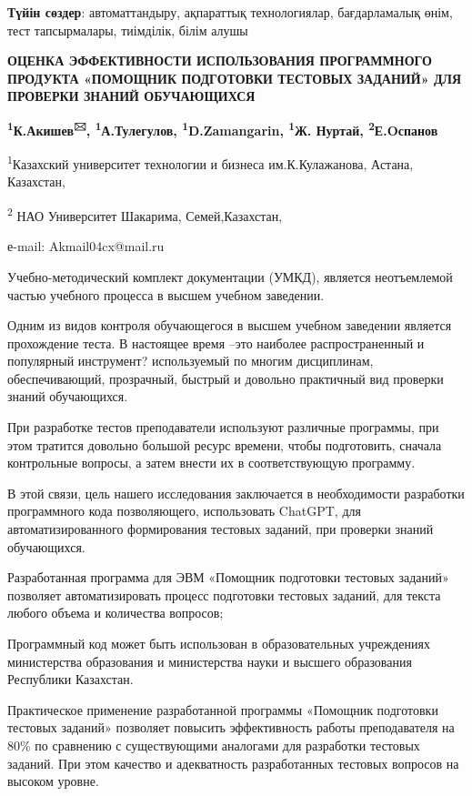 {\bfseries Түйін сөздер}: автоматтандыру, ақпараттық технологиялар,
бағдарламалық өнім, тест тапсырмалары, тиімділік, білім алушы

{\bfseries ОЦЕНКА ЭФФЕКТИВНОСТИ ИСПОЛЬЗОВАНИЯ ПРОГРАММНОГО ПРОДУКТА
«ПОМОЩНИК ПОДГОТОВКИ ТЕСТОВЫХ ЗАДАНИЙ» ДЛЯ ПРОВЕРКИ ЗНАНИЙ ОБУЧАЮЩИХСЯ}

{\bfseries \textsuperscript{1}К.Акишев\textsuperscript{🖂},
\textsuperscript{1}А.Тулегулов, \textsuperscript{1}D.Zamangarin,
\textsuperscript{1}Ж. Нуртай, \textsuperscript{2}Е.Oспанов}

\textsuperscript{1}Казахский университет технологии и бизнеса
им.К.Кулажанова, Астана, Казахстан,

\textsuperscript{2} НАО Университет Шакарима, Семей,Казахстан,

е-mail: Akmail04cx@mail.ru

Учебно-методический комплект документации (УМКД), является неотъемлемой
частью учебного процесса в высшем учебном заведении.

Одним из видов контроля обучающегося в высшем учебном заведении является
прохождение теста. В настоящее время --это наиболее распространенный и
популярный инструмент? используемый по многим дисциплинам,
обеспечивающий, прозрачный, быстрый и довольно практичный вид проверки
знаний обучающихся.

При разработке тестов преподаватели используют различные программы, при
этом тратится довольно большой ресурс времени, чтобы подготовить,
сначала контрольные вопросы, а затем внести их в соответствующую
программу.

В этой связи, цель нашего исследования заключается в необходимости
разработки программного кода позволяющего, использовать ChatGPT, для
автоматизированного формирования тестовых заданий, при проверки знаний
обучающихся.

Разработанная программа для ЭВМ «Помощник подготовки тестовых заданий»
позволяет автоматизировать процесс подготовки тестовых заданий, для
текста любого объема и количества вопросов;

Программный код может быть использован в образовательных учреждениях
министерства образования и министерства науки и высшего образования
Республики Казахстан.

Практическое применение разработанной программы «Помощник подготовки
тестовых заданий» позволяет повысить эффективность работы преподавателя
на 80\% по сравнению с существующими аналогами для разработки тестовых
заданий. При этом качество и адекватность разработанных тестовых
вопросов на высоком уровне.

